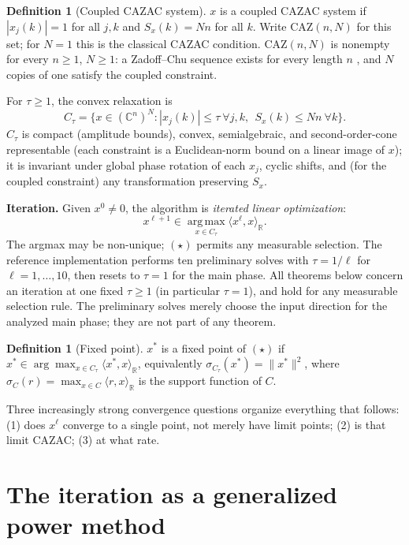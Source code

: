 \documentclass[11pt]{article}
\theoremstyle{plain}
\theoremstyle{definition}
\newtheorem{definition}[theorem]{Definition}
\theoremstyle{remark}
\newcommand{\R}{\mathbb R}
\newcommand{\C}{\mathbb C}
\newcommand{\CAZ}{\mathrm{CAZ}}
\begin{document}
\begin{definition}[Coupled CAZAC system]
$x$ is a coupled CAZAC system if $|x_j(k)|=1$ for all $j,k$ and
$S_x(k)=Nn$ for all $k$. Write $\CAZ(n,N)$ for this set; for $N=1$ this is
the classical CAZAC condition. $\CAZ(n,N)$ is nonempty for every $n\ge1$,
$N\ge1$: a Zadoff--Chu sequence exists for every length $n$ \cite{Chu72},
and $N$ copies of one satisfy the coupled constraint.
\end{definition}

For $\tau\ge1$, the convex relaxation is
$$C_\tau=\bigl\{x\in(\C^n)^N: |x_j(k)|\le\tau\ \forall j,k,\ \ S_x(k)\le Nn\ \forall k\bigr\}.$$
$C_\tau$ is compact (amplitude bounds), convex, semialgebraic, and
second-order-cone representable (each constraint is a Euclidean-norm bound
on a linear image of $x$); it is invariant under global phase rotation of
each $x_j$, cyclic shifts, and (for the coupled constraint) any
transformation preserving $S_x$.

\textbf{Iteration.} Given $x^0\ne0$, the algorithm is \emph{iterated linear
optimization}:
\begin{equation}
x^{\ell+1}\in\operatorname*{arg\,max}_{x\in C_\tau}\langle x^\ell,x\rangle_\R. \tag{$\star$}
\end{equation}
The argmax may be non-unique; $(\star)$ permits any measurable selection.
The reference implementation performs ten preliminary solves with
$\tau=1/\ell$ for $\ell=1,\dots,10$, then resets to $\tau=1$ for the main
phase.  All theorems below concern an iteration at one fixed $\tau\ge1$
(in particular $\tau=1$), and hold for any measurable selection rule.  The
preliminary solves merely choose the input direction for the analyzed main
phase; they are not part of any theorem.

\begin{definition}[Fixed point]
$x^*$ is a fixed point of $(\star)$ if
$x^*\in\arg\max_{x\in C_\tau}\langle x^*,x\rangle_\R$, equivalently
$\sigma_{C_\tau}(x^*)=\|x^*\|^2$, where
$\sigma_C(r)=\max_{x\in C}\langle r,x\rangle_\R$ is the support function of $C$.
\end{definition}

Three increasingly strong convergence questions organize everything that
follows: (1) does $x^\ell$ converge to a single point, not merely have
limit points; (2) is that limit CAZAC; (3) at what rate.

\section{The iteration as a generalized power method}
\end{document}
